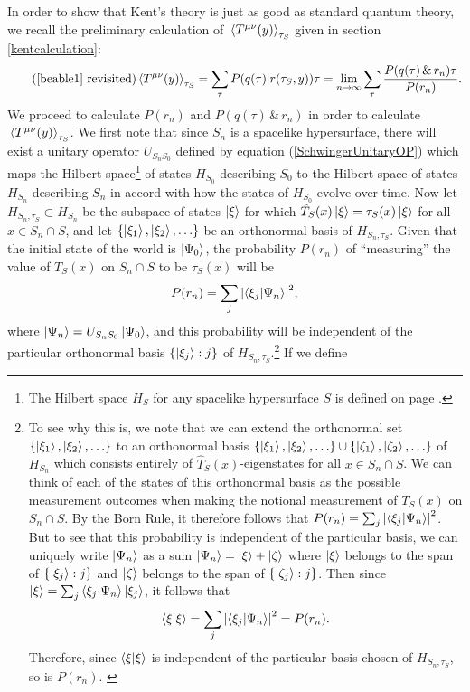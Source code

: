 In order to show that Kent's theory is just as good as standard quantum theory, we recall the preliminary calculation of $\ev*{T^{\mu\nu}(y)}_{\tau_S}$ given in section \ref{kentcalculation}:
\begin{equation}\tag{\ref{beable1} revisited}
	\ev*{T^{\mu\nu}(y)}_{\tau_S}=\sum_\tau P(q(\tau) | r(\tau_S,y))\tau=\lim_{n\rightarrow\infty}\sum_\tau\frac{P(q(\tau) \, \& \, r_n)\tau}{P(r_n)}.
\end{equation}
We proceed to calculate $P(r_n)$ and $P(q(\tau)\, \& \,r_n)$ in order to calculate  $\ev*{T^{\mu\nu}(y)}_{\tau_S}$. We first note that since $S_n$ is a spacelike hypersurface,   there will exist a unitary operator $U_{S_nS_0}$ defined by equation (\ref{SchwingerUnitaryOP}) which maps the Hilbert space\footnote{The Hilbert space $H_S$ for any spacelike hypersurface $S$ is defined on page \pageref{HSdef}.} of states $H_{S_0}$ describing $S_0$ to the Hilbert space of states $H_{S_n}$\label{HSidef} describing $S_n$ in accord with how the states of $H_{S_0}$  evolve over time. Now let $H_{S_n,\tau_S}\label{HStau}\subset H_{S_n}$ be the subspace of states $\ket{\xi}$ for which  $\hat{T}_S(x)\ket{\xi}=\tau_S(x)\ket{\xi}$  for all $x\in S_n\cap S$, and  let $\{\ket{\xi_1},\ket{\xi_2},\ldots\}$ be an orthonormal basis of $H_{S_n,\tau_S}$. Given that the initial state of the world is $\ket{\Psi_0}$, the probability $P(r_n)$ of ``measuring'' the value of $T_S(x)$ on $S_n\cap S$ to be $\tau_S(x)$ will be 
\begin{equation}\label{Pri}
P(r_n)=\sum_j \abs{ \ip{\xi_j}{\Psi_n}}^2,
\end{equation}
where $\ket{\Psi_n}=U_{S_nS_0}\ket{\Psi_0}$, and this probability will be independent of the particular orthonormal basis  $\{\ket{\xi_j}:j\}$ of $H_{S_n,\tau_S}$.\footnote{To see why this is, we note that we can extend the orthonormal set $\{\ket{\xi_1},\ket{\xi_2},\ldots\}$ to an orthonormal basis  $\{\ket{\xi_1},\ket{\xi_2},\ldots\}\cup\{\ket{\zeta_1},\ket{\zeta_2},\ldots\}$ of $H_{S_n}$ which consists entirely of $\hat{T}_S(x)$-eigenstates for all $x\in S_n\cap S$. We can think of each of the states of this orthonormal basis as the possible measurement outcomes when making the notional measurement of $T_S(x)$ on $S_n\cap S$. By the Born Rule, it therefore follows that $P(r_n)=\sum_j \abs{ \ip{\xi_j}{\Psi_n}}^2$. But to see that this probability is independent of the particular basis, we can uniquely write $\ket{\Psi_n}$ as a sum $\ket{\Psi_n}=\ket{\xi}+\ket{\zeta}$ where $\ket{\xi}$ belongs to the span of $\{\ket{\xi_j}:j\}$ and $\ket{\zeta}$ belongs to the span of $\{\ket{\zeta_j}:j\}$.  Then since $\ket{\xi}=\sum_j\ip{\xi_j}{\Psi_n}\ket{\xi_j}$, it follows that $$\ip{\xi}{\xi}=\sum_j\abs{ \ip{\xi_j}{\Psi_n}}^2=P(r_n).$$ Therefore, since  $\ip{\xi}{\xi}$ is independent of the particular basis chosen of $H_{S_n,\tau_S}$, so is $P(r_n)$.  \label{priproof} } If we define 
